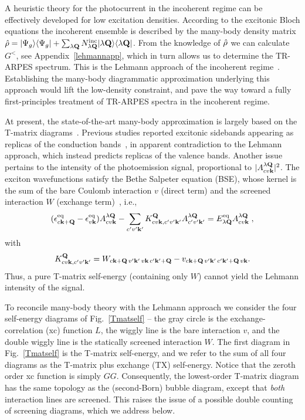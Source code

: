 \documentclass[twocolumn,aps,a4paper,superscriptaddress]{revtex4-2}
\begin{document}
A heuristic theory for the photocurrent in the incoherent regime
can be effectively developed for low excitation densities.
According to the excitonic Bloch equations the incoherent ensemble is described
by the many-body density matrix $\hat{\rho}=|\Psi_{g}\rangle\langle\Psi_{g}|+\sum_{\lambda{\mathbf Q}}N^{\rm
inc}_{\lambda{\mathbf Q}}|\lambda{\mathbf Q}\rangle\langle\lambda{\mathbf Q}|$. From the knowledge of
$\hat{\rho}$ we can calculate $G^{<}$, see Appendix~\ref{lehmannapp},
which in turn allows us to determine
the TR-ARPES spectrum. This is the Lehmann approach of the incoherent
regime~\cite{perfetto_first-principles_2016,sangalli_an-ab-initio_2018,rustagi_photoemission_2018,stefanucci_from-carriers_2021,chen_first-principles_2022}.
Establishing the many-body diagrammatic approximation
underlying this approach
would lift the low-density constraint, and pave the way toward
a fully first-principles treatment of TR-ARPES spectra in the
incoherent  regime.

At present, the state-of-the-art many-body
approximation is largely based on
the T-matrix diagrams~\cite{kremp_equation_1984,semkat_ionization_2009,perfetto_first-principles_2016,steinhoff_exciton_2017}.
Previous studies reported
excitonic sidebands appearing as replicas
of the conduction bands~\cite{perfetto_first-principles_2016,steinhoff_exciton_2017},
in apparent contradiction to the Lehmann
approach, which instead predicts replicas of the valence bands.
Another issue pertains to the intensity of the photoemission signal,
proportional to $|A^{\lambda{\mathbf Q}}_{cv{\mathbf k}}|^{2}$. The
exciton wavefunctions satisfy the Bethe
Salpeter equation (BSE), whose
kernel is the sum of the bare
Coulomb interaction $v$ (direct term) and the screened interaction $W$
(exchange term)~\cite{onida_electronic_2002,strinati_application_1988,svl-book_2025}, i.e.,
\begin{align}
(\epsilon^{\rm eq}_{c{\mathbf k}+{\mathbf Q}}-\epsilon^{\rm eq}_{v{\mathbf k}})A^{\lambda{\mathbf Q}}_{cv{\mathbf k}}-
\sum_{c'v'{\mathbf k}'}
K^{{\mathbf Q}}_{cv{\mathbf k},c'v'{\mathbf k}'}A^{\lambda{\mathbf Q}}_{c'v'{\mathbf k}'}=
E^{\rm eq}_{\lambda{\mathbf Q}}A^{\lambda{\mathbf Q}}_{cv{\mathbf k}}\;,
\label{eigeneqX}
\end{align}
with
\begin{align}
K^{{\mathbf Q}}_{cv{\mathbf k},c'v'{\mathbf k}'}=
W_{c{\mathbf k}+{\mathbf Q}\,v'{\mathbf k}'\,v{\mathbf k}\,c'{\mathbf k}'+{\mathbf Q}}-
v_{c{\mathbf k}+{\mathbf Q}\,v'{\mathbf k}'\,c'{\mathbf k}'+{\mathbf Q}\,v{\mathbf k}}.
\label{hsex}
\end{align}
Thus, a pure T-matrix self-energy (containing only
$W$) cannot yield the
Lehmann intensity of the signal.

To reconcile many-body theory with the  Lehmann approach we consider the four self-energy
diagrams of Fig.~\ref{Tmatself}  -- the gray
circle is the exchange-correlation (xc) function $L$, the wiggly line
is the bare interaction $v$, and the double wiggly line is the
statically screened interaction $W$.
The first diagram in Fig.~\ref{Tmatself} is the T-matrix self-energy,
and  we refer to the sum of all four diagrams as the T-matrix plus
exchange (TX) self-energy.
Notice that the zeroth order xc function is simply $GG$. Consequently,
the lowest-order T-matrix diagram
has the same topology as the (second-Born) bubble diagram,
except that {\em both} interaction lines are screened.
This raises the issue of a possible double counting of screening
diagrams, which we address below.
\end{document}
